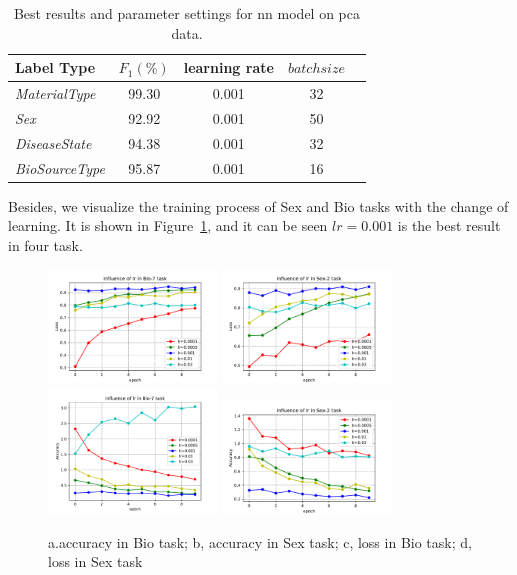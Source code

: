 \documentclass[sigconf]{acmart}
\begin{document}
	\begin{table}[tbp]
		\centering
		\begin{tabular}{l|cccc}
			\toprule
			{Label Type} & $F_1 (\%)$ & learning rate &$batch size$  \\
			\midrule
			{\textit{MaterialType}}&99.30 & 0.001 &32\\
			{\textit{Sex}}		& 92.92 & 0.001    &50 \\
			{\textit{DiseaseState}}& 94.38 & 0.001 &32\\
			{\textit{BioSourceType}}& 95.87 & 0.001 &16\\
			\bottomrule	
		\end{tabular}
		
		\caption{Best results and parameter settings for nn model on pca data. }
		\label{nnpca_result}
	\end{table}
	
	Besides, we visualize the training process of Sex and Bio tasks with the change of learning. It is shown in Figure~\ref{lr_result}, and it can be seen $lr=0.001$ is the best result in four task. 
	
	\begin{figure}[]
		\centering
		\includegraphics[width=0.4\textwidth]{../figs/lr_acc_bio.pdf}
		\includegraphics[width=0.4\textwidth]{../figs/lr_acc_sex.pdf}
		\includegraphics[width=0.4\textwidth]{../figs/lr_loss_bio.pdf}
		\includegraphics[width=0.4\textwidth]{../figs/lr_loss_sex.pdf}
		\caption{a.accuracy in Bio task;  b, accuracy in Sex task; c, loss in Bio task; d, loss in Sex task}
		\label{lr_result}
		\centering
	\end{figure}
	
\end{document}
